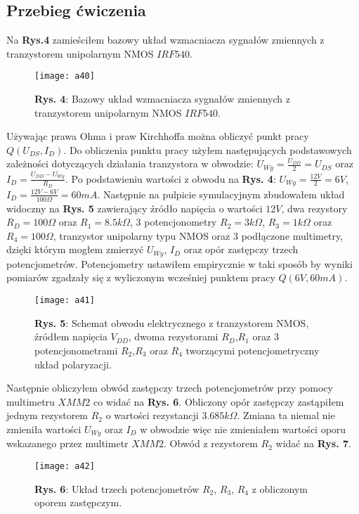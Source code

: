 \documentclass[11pt]{article}
\begin{document}
\subsection{Przebieg ćwiczenia}
Na \textbf{Rys.4} zamieściłem bazowy układ wzmacniacza sygnałów zmiennych z tranzystorem unipolarnym NMOS $IRF540$.
\begin{figure}[H]
\centering
\texttt{[image: a40]}
\caption*{\textbf{Rys. 4}: Bazowy układ wzmacniacza sygnałów zmiennych z tranzystorem unipolarnym NMOS $IRF540$.}
\end{figure}
\noindent Używając prawa Ohma i praw Kirchhoffa można obliczyć punkt pracy $Q(U_{DS},I_D)$. Do obliczenia punktu pracy użyłem następujących podstawowych zależności dotyczących działania tranzystora w obwodzie:
$U_{Wy} = \frac{U_{DD}}{2} = U_{DS}$ oraz $I_D = \frac{U_{DD}-U_{Wy}}{R_D}$. Po podstawieniu wartości z obwodu na \textbf{Rys. 4}: $U_{Wy} = \frac{12V}{2} = 6V$, $I_D = \frac{12V-6V}{100\Omega} = 60mA$. \newline
Następnie na pulpicie symulacyjnym zbudowałem układ widoczny na \textbf{Rys. 5} zawierający źródło napięcia o wartości $12V$, dwa rezystory $R_D = 100\Omega$ oraz $R_1 = 8.5k\Omega$, 3 potencjonometry $R_2 = 3k\Omega$,
$R_3 = 1k\Omega$ oraz $R_4 = 100\Omega$, tranzystor unipolarny typu NMOS oraz 3 podłączone multimetry, dzięki którym mogłem zmierzyć $U_{Wy}$, $I_D$ oraz opór zastępczy trzech potencjometrów. Potencjometry ustawiłem empirycznie 
w taki sposób by wyniki pomiarów zgadzały się z wyliczonym wcześniej punktem pracy $Q(6V,60mA)$.
\begin{figure}[H]
\centering
\texttt{[image: a41]}
\caption*{\textbf{Rys. 5}: Schemat obwodu elektrycznego z tranzystorem NMOS, źródłem napięcia $V_{DD}$, dwoma rezystorami $R_D$,$R_1$ oraz 3 potencjonometrami $R_2$,$R_3$ oraz $R_4$ tworzącymi potencjometryczny układ polaryzacji.}
\end{figure}
\noindent Następnie obliczyłem obwód zastępczy trzech potencjometrów przy pomocy multimetru $XMM2$ co widać na \textbf{Rys. 6}. Obliczony opór zastępczy zastąpiłem jednym rezystorem $R_2$ o wartości rezystancji $3.685k\Omega$. Zmiana ta niemal nie zmieniła wartości $U_{Wy}$ oraz $I_D$ w obwodzie więc nie zmieniałem wartości oporu wskazanego przez multimetr $XMM2$. Obwód z rezystorem $R_2$ widać na \textbf{Rys. 7}.
\begin{figure}[H]
\centering
\texttt{[image: a42]}
\caption*{\textbf{Rys. 6}: Układ trzech potencjometrów $R_2$, $R_3$, $R_4$ z obliczonym oporem zastępczym.}
\end{figure}
\end{document}
